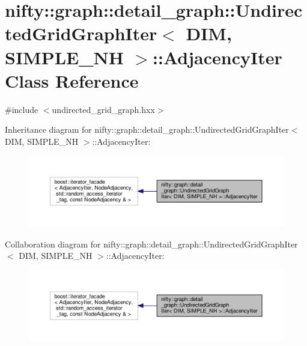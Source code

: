 \hypertarget{classnifty_1_1graph_1_1detail__graph_1_1UndirectedGridGraphIter_1_1AdjacencyIter}{}\section{nifty\+:\+:graph\+:\+:detail\+\_\+graph\+:\+:Undirected\+Grid\+Graph\+Iter$<$ D\+I\+M, S\+I\+M\+P\+L\+E\+\_\+\+N\+H $>$\+:\+:Adjacency\+Iter Class Reference}
\label{classnifty_1_1graph_1_1detail__graph_1_1UndirectedGridGraphIter_1_1AdjacencyIter}


{\ttfamily \#include $<$undirected\+\_\+grid\+\_\+graph.\+hxx$>$}



Inheritance diagram for nifty\+:\+:graph\+:\+:detail\+\_\+graph\+:\+:Undirected\+Grid\+Graph\+Iter$<$ D\+I\+M, S\+I\+M\+P\+L\+E\+\_\+\+N\+H $>$\+:\+:Adjacency\+Iter\+:\nopagebreak
\begin{figure}[H]
\begin{center}
\leavevmode
\includegraphics[width=350pt]{classnifty_1_1graph_1_1detail__graph_1_1UndirectedGridGraphIter_1_1AdjacencyIter__inherit__graph}
\end{center}
\end{figure}


Collaboration diagram for nifty\+:\+:graph\+:\+:detail\+\_\+graph\+:\+:Undirected\+Grid\+Graph\+Iter$<$ D\+I\+M, S\+I\+M\+P\+L\+E\+\_\+\+N\+H $>$\+:\+:Adjacency\+Iter\+:\nopagebreak
\begin{figure}[H]
\begin{center}
\leavevmode
\includegraphics[width=350pt]{classnifty_1_1graph_1_1detail__graph_1_1UndirectedGridGraphIter_1_1AdjacencyIter__coll__graph}
\end{center}
\end{figure}

